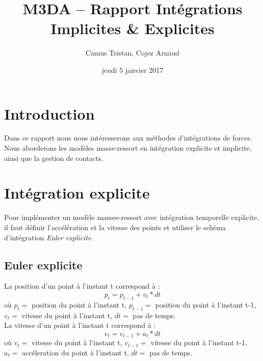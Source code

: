 \documentclass[a4paper]{article}
\begin{document}
\title{M3DA -- Rapport Intégrations Implicites \& Explicites}
\author{Camus Tristan, Cojez Arnaud}
\date{jeudi 5 janvier 2017}

\maketitle


\section{Introduction}

Dans ce rapport nous nous intéresserons aux méthodes d'intégrations de forces. Nous aborderons les modèles masse-ressort en intégration explicite et implicite, ainsi que la gestion de contacts.

\section{Intégration explicite}

Pour implémenter un modèle massee-ressort avec intégration temporelle explicite, il faut définir l'accélération et la vitesse des points et utiliser le schéma d'intégration {\em Euler explicite}.

\subsection{Euler explicite}

La position d'un point à l'instant t correspond à :
\begin{equation}
  p_t = p_{t-1} + v_t * dt
\end{equation}
où $p_t =$ position du point à l'instant t, $p_{t-1} =$ position du point à l'instant t-1, $v_t =$ vitesse du point à l'instant t, $dt =$ pas de temps.\\

La vitesse d'un point à l'instant t correspond à :
\begin{equation}
  v_t = v_{t-1} + a_t * dt
\end{equation}
où $v_t =$ vitesse du point à l'instant t, $v_{t-1} =$ vitesse du point à l'instant t-1, $a_t =$ accéleration du point à l'instant t, $dt =$ pas de temps.\\
\end{document}
